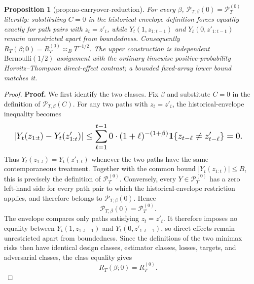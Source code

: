 \documentclass{article}
\newtheorem{proposition}{Proposition}
\begin{document}
\begin{proposition}[prop:no-carryover-reduction]\label{prop:no-carryover-reduction}
For every \(\beta\), \(\mathcal P_{T,\beta}(0)=\mathcal P_T^{(0)}\) literally: substituting \(C=0\) in the historical-envelope definition forces equality exactly for path pairs with \(z_t=z'_t\), while \(Y_t(1,z_{1:t-1})\) and \(Y_t(0,z'_{1:t-1})\) remain unrestricted apart from boundedness. Consequently \(R_T(\beta;0)=R_T^{(0)}\asymp_B T^{-1/2}\). The upper construction is independent \(\mathrm{Bernoulli}(1/2)\) assignment with the ordinary timewise positive-probability Horvitz--Thompson direct-effect contrast; a bounded fixed-array lower bound matches it.
\end{proposition}
\begin{proof}
\textbf{Proof.} We first identify the two classes. Fix \(\beta\) and substitute \(C=0\) in the definition of \(\mathcal P_{T,\beta}(C)\). For any two paths with \(z_t=z'_t\), the historical-envelope inequality becomes
\[
\makebox[\linewidth][c]{\resizebox{0.98\linewidth}{!}{\leavevmode\par\noindent \makebox[\linewidth][c]{\resizebox{0.98\linewidth}{!}{\(\displaystyle \displaystyle \left|Y_t(z_{1:t})-Y_t(z'_{1:t})\right|\le \sum_{\ell=1}^{t-1}0\cdot(1+\ell)^{-(1+\beta)}\mathbf 1\{z_{t-\ell}\ne z'_{t-\ell}\}=0.\)}}\par\noindent}}
\]
Thus \(Y_t(z_{1:t})=Y_t(z'_{1:t})\) whenever the two paths have the same contemporaneous treatment. Together with the common bound \(\lvert Y_t(z_{1:t})\rvert\le B\), this is precisely the definition of \(\mathcal P_T^{(0)}\). Conversely, every \(Y\in\mathcal P_T^{(0)}\) has a zero left-hand side for every path pair to which the historical-envelope restriction applies, and therefore belongs to \(\mathcal P_{T,\beta}(0)\). Hence
\[
\mathcal P_{T,\beta}(0)=\mathcal P_T^{(0)}.
\]
The envelope compares only paths satisfying \(z_t=z'_t\). It therefore imposes no equality between \(Y_t(1,z_{1:t-1})\) and \(Y_t(0,z'_{1:t-1})\), so direct effects remain unrestricted apart from boundedness. Since the definitions of the two minimax risks then have identical design classes, estimator classes, losses, targets, and adversarial classes, the class equality gives
\[
R_T(\beta;0)=R_T^{(0)}.
\]


\end{proof}
\end{document}
